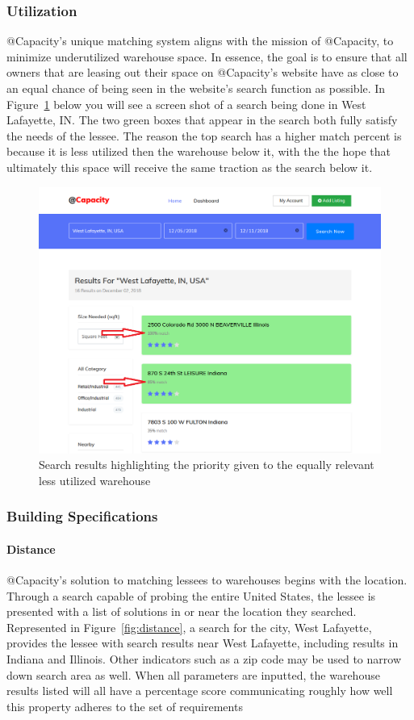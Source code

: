 \subsubsection{Utilization}
@Capacity's unique matching system aligns with the mission of @Capacity, to minimize underutilized warehouse space. In essence, the goal is to ensure that all owners that are leasing out their space on @Capacity's website have as close to an equal chance of being seen in the website's search function as possible. In Figure~\ref{fig:utilization2} below you will see a screen shot of a search being done in West Lafayette, IN. The two green boxes that appear in the search both fully satisfy the needs of the lessee. The reason the top search has a higher match percent is because it is less utilized then the warehouse below it, with the the hope that ultimately this space will receive the same traction as the search below it. 
\begin{figure}[tbh]
\centering
\includegraphics[width=.75\textwidth]{Phase_3/utilization}
\caption{Search results highlighting the priority given to the equally relevant less utilized warehouse}
\label{fig:utilization2}
\end{figure}


\subsubsection{Building Specifications}
\paragraph{Distance}
@Capacity's solution to matching lessees to warehouses begins with the location.  Through a search capable of probing the entire United States, the lessee is presented with a list of solutions in or near the location they searched.  Represented in Figure~\ref{fig:distance}, a search for the city, West Lafayette, provides the lessee with search results near West Lafayette, including results in Indiana and Illinois. Other indicators such as a zip code may be used to narrow down search area as well. When all parameters are inputted, the warehouse results listed will all have a percentage score communicating roughly how well this property adheres to the set of requirements

